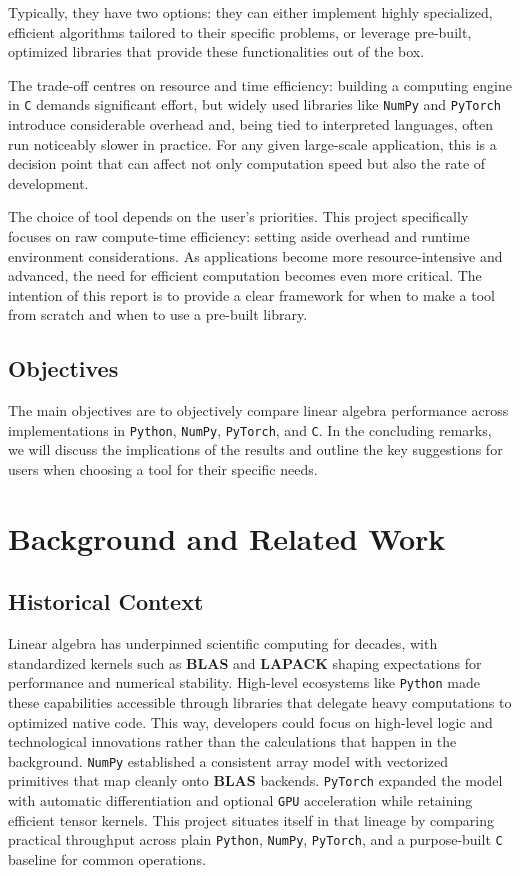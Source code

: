 \documentclass[a4paper,12pt]{article}
\begin{document}
Typically, they have two options: they can either implement highly specialized, efficient algorithms tailored to their specific problems, or leverage pre-built, optimized libraries that provide these functionalities out of the box.

The trade-off centres on resource and time efficiency: building a computing engine in \texttt{C} demands significant effort, but widely used libraries like \texttt{NumPy} and \texttt{PyTorch} introduce considerable overhead and, being tied to interpreted languages, often run noticeably slower in practice. For any given large-scale application, this is a decision point that can affect not only computation speed but also the rate of development.

The choice of tool depends on the user's priorities. This project specifically focuses on raw compute-time efficiency: setting aside overhead and runtime environment considerations. As applications become more resource-intensive and advanced, the need for efficient computation becomes even more critical. The intention of this report is to provide a clear framework for when to make a tool from scratch and when to use a pre-built library.

\subsection{Objectives}
The main objectives are to objectively compare linear algebra performance across implementations in \texttt{Python}, \texttt{NumPy}, \texttt{PyTorch}, and \texttt{C}. In the concluding remarks, we will discuss the implications of the results and outline the key suggestions for users when choosing a tool for their specific needs.

\section{Background and Related Work}
\subsection{Historical Context}
Linear algebra has underpinned scientific computing for decades, with standardized kernels such as \textbf{BLAS} and \textbf{LAPACK} shaping expectations for performance and numerical stability. High-level ecosystems like \texttt{Python} made these capabilities accessible through libraries that delegate heavy computations to optimized native code. This way, developers could focus on high-level logic and technological innovations rather than the calculations that happen in the background. \texttt{NumPy} established a consistent array model with vectorized primitives that map cleanly onto \textbf{BLAS} backends. \texttt{PyTorch} expanded the model with automatic differentiation and optional \texttt{GPU} acceleration while retaining efficient tensor kernels. This project situates itself in that lineage by comparing practical throughput across plain \texttt{Python}, \texttt{NumPy}, \texttt{PyTorch}, and a purpose-built \texttt{C} baseline for common operations.
\end{document}
